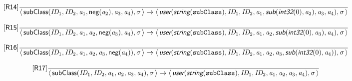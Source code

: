 \documentclass[10pt,leqno]{article}
\newcommand{\artVariable}[1]{\mbox{\em #1\/}}
\newcommand{\artConstructor}[1]{\mbox{\sf #1}}
\newcommand{\artCaseInsensitiveLiteral}[1]{\mbox{\tt #1}}
\newcommand{\artSpecial}[1]{\mbox{\sf\em #1}}
\begin{document}
\begin{equation}
\tag*{[\artConstructor{\sf R14}]}\frac{}{\langle\, \artConstructor{\sf subClass}(\artVariable{ID$_{1}$}, \artVariable{ID$_{2}$}, \artVariable{a$_{1}$}, \artConstructor{\sf neg}(\artVariable{a$_{2}$}), \artVariable{a$_{3}$}, \artVariable{a$_{4}$}), \artVariable{$\sigma$}\,\rangle \rightarrow \langle\, \artSpecial{user}(\artSpecial{string}(\artCaseInsensitiveLiteral{subClass}), \artVariable{ID$_{1}$}, \artVariable{ID$_{2}$}, \artVariable{a$_{1}$}, \artSpecial{sub}(\artSpecial{int32}(0), \artVariable{a$_{2}$}), \artVariable{a$_{3}$}, \artVariable{a$_{4}$}), \artVariable{$\sigma$}\,\rangle }
\end{equation}

\begin{equation}
\tag*{[\artConstructor{\sf R15}]}\frac{}{\langle\, \artConstructor{\sf subClass}(\artVariable{ID$_{1}$}, \artVariable{ID$_{2}$}, \artVariable{a$_{1}$}, \artVariable{a$_{2}$}, \artConstructor{\sf neg}(\artVariable{a$_{3}$}), \artVariable{a$_{4}$}), \artVariable{$\sigma$}\,\rangle \rightarrow \langle\, \artSpecial{user}(\artSpecial{string}(\artCaseInsensitiveLiteral{subClass}), \artVariable{ID$_{1}$}, \artVariable{ID$_{2}$}, \artVariable{a$_{1}$}, \artVariable{a$_{2}$}, \artSpecial{sub}(\artSpecial{int32}(0), \artVariable{a$_{3}$}), \artVariable{a$_{4}$}), \artVariable{$\sigma$}\,\rangle }
\end{equation}

\begin{equation}
\tag*{[\artConstructor{\sf R16}]}\frac{}{\langle\, \artConstructor{\sf subClass}(\artVariable{ID$_{1}$}, \artVariable{ID$_{2}$}, \artVariable{a$_{1}$}, \artVariable{a$_{2}$}, \artVariable{a$_{3}$}, \artConstructor{\sf neg}(\artVariable{a$_{4}$})), \artVariable{$\sigma$}\,\rangle \rightarrow \langle\, \artSpecial{user}(\artSpecial{string}(\artCaseInsensitiveLiteral{subClass}), \artVariable{ID$_{1}$}, \artVariable{ID$_{2}$}, \artVariable{a$_{1}$}, \artVariable{a$_{2}$}, \artVariable{a$_{3}$}, \artSpecial{sub}(\artSpecial{int32}(0), \artVariable{a$_{4}$})), \artVariable{$\sigma$}\,\rangle }
\end{equation}

\begin{equation}
\tag*{[\artConstructor{\sf R17}]}\frac{}{\langle\, \artConstructor{\sf subClass}(\artVariable{ID$_{1}$}, \artVariable{ID$_{2}$}, \artVariable{a$_{1}$}, \artVariable{a$_{2}$}, \artVariable{a$_{3}$}, \artVariable{a$_{4}$}), \artVariable{$\sigma$}\,\rangle \rightarrow \langle\, \artSpecial{user}(\artSpecial{string}(\artCaseInsensitiveLiteral{subClass}), \artVariable{ID$_{1}$}, \artVariable{ID$_{2}$}, \artVariable{a$_{1}$}, \artVariable{a$_{2}$}, \artVariable{a$_{3}$}, \artVariable{a$_{4}$}), \artVariable{$\sigma$}\,\rangle }
\end{equation}
\end{document}
